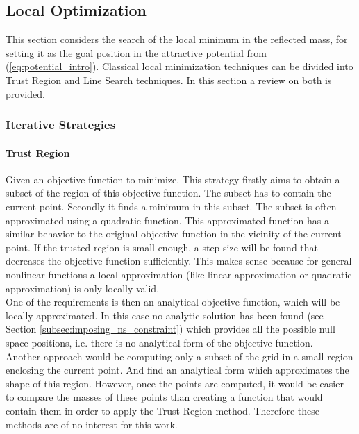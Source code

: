 \subsection{Local Optimization}
\label{ch:localoptimization}
\label{sec:localoptimization}


This section considers the search of the 
local minimum in the reflected mass, for setting it as the goal position in the attractive potential from (\ref{eq:potential_intro}). Classical local minimization techniques can be divided  into Trust Region and Line Search   techniques. In this section a review on both is provided.



\subsubsection{Iterative Strategies}
\label{sec:iterative_strategies}


\paragraph{Trust Region}
\label{subsec:tregion}

Given an objective function to minimize. This  strategy firstly aims to obtain a subset of the region of this objective function. The subset has to contain the current point. Secondly it finds a minimum in this subset. The subset is often approximated using a quadratic function. This approximated function has a similar behavior to the original objective function in the vicinity of the current point. If the trusted region is small enough, a step size will be found that decreases the objective function sufficiently. This makes sense because for general nonlinear functions a local approximation (like linear approximation or quadratic approximation)  is only locally valid. \\ 
%
One of the requirements is then an analytical objective function, which will be locally approximated. In this case no analytic solution has been found (see Section \ref{subsec:imposing_ns_constraint}) which  provides all the possible null space positions, i.e. there is no analytical form of the objective function.\\
%
%
Another approach would be computing only a subset of the grid in a small region enclosing the current point. And find an analytical form which approximates the shape of this region. However, once the points are computed, it would be easier to compare the masses of these points than creating a function that would contain them in order to apply the Trust Region method. Therefore these methods are of no interest for this work.






